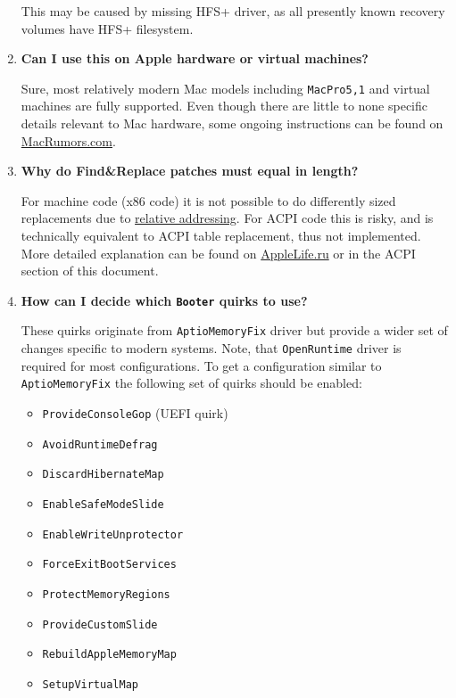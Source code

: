 \documentclass[]{article}
\providecommand{\tightlist}{%
  \setlength{\itemsep}{0pt}\setlength{\parskip}{0pt}}
\begin{document}
\begin{enumerate}
  This may be caused by missing HFS+ driver, as all presently known recovery volumes
  have HFS+ filesystem.

\item
  \textbf{Can I use this on Apple hardware or virtual machines?}

  Sure, most relatively modern Mac models including \texttt{MacPro5,1} and virtual machines
  are fully supported. Even though there are little to none specific details relevant to
  Mac hardware, some ongoing instructions can be found on
  \href{https://forums.macrumors.com/threads/opencore-on-the-mac-pro.2207814}{MacRumors.com}.

\item
  \textbf{Why do Find\&Replace patches must equal in length?}

  For machine code (x86 code) it is not possible to do differently sized replacements due to
  \href{https://en.wikipedia.org/w/index.php?title=Relative_addressing}{relative addressing}.
  For ACPI code this is risky, and is technically equivalent to ACPI table replacement,
  thus not implemented. More detailed explanation can be found on
  \href{https://applelife.ru/posts/819790}{AppleLife.ru} or in the ACPI section of this document.

\item
  \textbf{How can I decide which \texttt{Booter} quirks to use?}

  These quirks originate from \texttt{AptioMemoryFix} driver but provide a wider
  set of changes specific to modern systems. Note, that \texttt{OpenRuntime}
  driver is required for most configurations. To get a configuration similar
  to \texttt{AptioMemoryFix} the following set of quirks should be enabled:
  \begin{itemize}
  \tightlist
  \item \texttt{ProvideConsoleGop} (UEFI quirk)
  \item \texttt{AvoidRuntimeDefrag}
  \item \texttt{DiscardHibernateMap}
  \item \texttt{EnableSafeModeSlide}
  \item \texttt{EnableWriteUnprotector}
  \item \texttt{ForceExitBootServices}
  \item \texttt{ProtectMemoryRegions}
  \item \texttt{ProvideCustomSlide}
  \item \texttt{RebuildAppleMemoryMap}
  \item \texttt{SetupVirtualMap}
  \end{itemize}


\end{enumerate}
\end{document}

